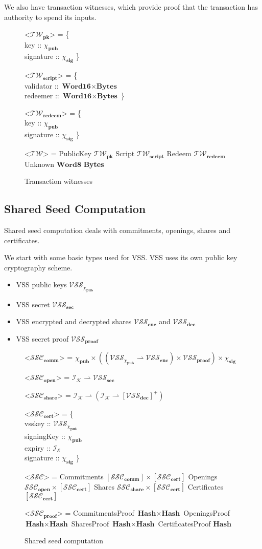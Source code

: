 \documentclass{article}
\def\fld{\\\llap{,\quad}}%
\newcommand{\rhu}{\rightharpoonup}
\newcommand{\lists}[1]{\left[{#1}\right]}
\newcommand{\nelists}[1]{\left[{#1}\right]^+}
\newcommand{\idsof}[1]{\mathcal{I}\!_#1}
\newcommand{\epochids}{\idsof{\mathcal{E}}}
\newcommand{\stakeholderids}{\idsof{\mathcal{K}}}
\newcommand{\pubkey}{\chi_{\textbf{pub}}}
\newcommand{\signature}{\chi_{\textbf{sig}}}
\newcommand{\vsspubkey}{\mathcal{VSS}_{\chi_{\textbf{pub}}}}
\newcommand{\vssproof}{\mathcal{VSS}_{\textbf{proof}}}
\newcommand{\vsssec}{\mathcal{VSS}_{\textbf{sec}}}
\newcommand{\vssencshare}{\mathcal{VSS}_{\textbf{enc}}}
\newcommand{\vssdecshare}{\mathcal{VSS}_{\textbf{dec}}}
\newcommand{\twit}{\mathcal{TW}}
\newcommand{\twitpk}{\twit_{\textbf{pk}}}
\newcommand{\twitscript}{\twit_{\textbf{script}}}
\newcommand{\twitredeem}{\twit_{\textbf{redeem}}}
\newcommand{\ssc}{\mathcal{SSC}}
\newcommand{\ssccomm}{\ssc_{\textbf{comm}}}
\newcommand{\sscopen}{\ssc_{\textbf{open}}}
\newcommand{\sscshare}{\ssc_{\textbf{share}}}
\newcommand{\ssccert}{\ssc_{\textbf{cert}}}
\newcommand{\sscpf}{\ssc_{\textbf{proof}}}
\newcommand{\hstype}[1]{\textbf{#1}}
\newcommand{\Word}[1]{\hstype{Word#1}}
\newcommand{\hash}{\hstype{Hash}}
\newcommand{\Bytes}{\hstype{Bytes}}
\begin{document}
We also have transaction witnesses, which provide proof that the transaction has
authority to spend its inputs.

\begin{figure}[H]
  \caption{Transaction witnesses}
  \begin{grammar}
    <$\twitpk$> = \{
    \fld key :: $\pubkey$
    \fld signature :: $\signature$
    \}

    <$\twitscript$> = \{
    \fld validator :: $\Word{16}\times\Bytes$
    \fld redeemer :: $\Word{16}\times\Bytes$
    \}

    <$\twitredeem$> = \{
    \fld key :: $\pubkey$
    \fld signature :: $\signature$
    \}

    <$\twit$> = PublicKey $\twitpk$
    \alt Script $\twitscript$
    \alt Redeem $\twitredeem$
    \alt Unknown $\Word{8}$ \Bytes
  \end{grammar}
\end{figure}

\subsection{Shared Seed Computation}

Shared seed computation deals with commitments, openings, shares and
certificates.

We start with some basic types used for VSS. VSS uses its own public key
cryptography scheme.

\begin{itemize}
\item VSS public keys $\vsspubkey$
\item VSS secret $\vsssec$
\item VSS encrypted and decrypted shares $\vssencshare$ and $\vssdecshare$
\item VSS secret proof $\vssproof$
\end{itemize}

\begin{figure}[H]
 \caption{Shared seed computation}
 \begin{grammar}
   <$\ssccomm$> = $\pubkey \times ((\vsspubkey \rhu \vssencshare) \times \vssproof)
                           \times \signature$

   <$\sscopen$> = $\stakeholderids \rhu \vsssec$

   <$\sscshare$> = $\stakeholderids \rhu (\stakeholderids \rhu \nelists{\vssdecshare})$

   <$\ssccert$> = \{
   \fld vsskey :: $\vsspubkey$
   \fld signingKey :: $\pubkey$
   \fld expiry :: $\epochids$
   \fld signature :: $\signature$
   \}

   <$\ssc$> = Commitments $\lists{\ssccomm} \times \lists{\ssccert}$
   \alt Openings $\sscopen \times \lists{\ssccert}$
   \alt Shares $\sscshare \times \lists{\ssccert}$
   \alt Certificates $\lists{\ssccert}$

   <$\sscpf$> = CommitmentsProof $\hash \times \hash$
   \alt OpeningsProof $\hash \times \hash$
   \alt SharesProof $\hash \times \hash$
   \alt CertificatesProof $\hash$
 \end{grammar}
\end{figure}
\end{document}
